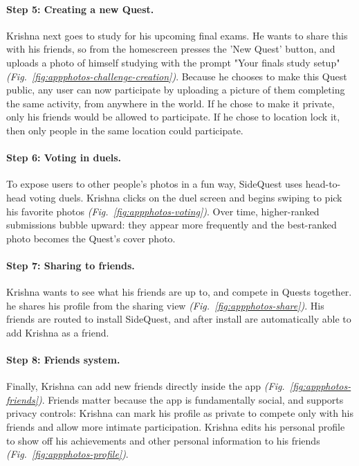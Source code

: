 \documentclass[12pt]{article}
\begin{document}
\paragraph{Step 5: Creating a new Quest.}
Krishna next goes to study for his upcoming final exams. He wants to share this with his friends, so from the homescreen presses the 'New Quest' button, and uploads a photo of himself studying with the prompt "Your finals study setup" \textit{(Fig.~\ref{fig:appphotos-challenge-creation})}. Because he chooses to make this Quest public, any user can now participate by uploading a picture of them completing the same activity, from anywhere in the world. If he chose to make it private, only his friends would be allowed to participate. If he chose to location lock it, then only people in the same location could participate.

\paragraph{Step 6: Voting in duels.}
To expose users to other people's photos in a fun way, SideQuest uses head-to-head voting duels. Krishna clicks on the duel screen and begins swiping to pick his favorite photos \textit{(Fig.~\ref{fig:appphotos-voting})}. Over time, higher-ranked submissions bubble upward: they appear more frequently and the best-ranked photo becomes the Quest's cover photo.

\paragraph{Step 7: Sharing to friends.}
Krishna wants to see what his friends are up to, and compete in Quests together. he shares his profile from the sharing view \textit{(Fig.~\ref{fig:appphotos-share})}. His friends are routed to install SideQuest, and after install are automatically able to add Krishna as a friend.

\paragraph{Step 8: Friends system.}
Finally, Krishna can add new friends directly inside the app \textit{(Fig.~\ref{fig:appphotos-friends})}. Friends matter because the app is fundamentally social, and supports privacy controls: Krishna can mark his profile as private to compete only with his friends and allow more intimate participation. Krishna edits his personal profile to show off his achievements and other personal information to his friends \textit{(Fig.~\ref{fig:appphotos-profile})}.
\end{document}
